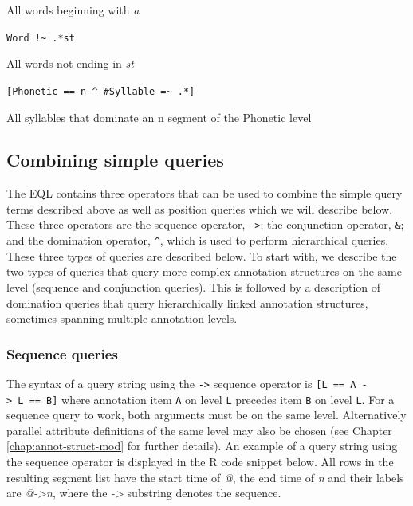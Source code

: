 \documentclass[]{book}
\begin{document}
All words beginning with \emph{a}

\texttt{Word\ !\textasciitilde{}\ .*st}

All words not ending in \emph{st}

\texttt{{[}Phonetic\ ==\ n\ \^{}\ \#Syllable\ =\textasciitilde{}\ .*{]}}

All syllables that dominate an n segment of the Phonetic level

\hypertarget{combining-simple-queries}{%
\subsection{Combining simple queries}\label{combining-simple-queries}}

The EQL contains three operators that can be used to combine the simple query terms described above as well as position queries which we will describe below. These three operators are the sequence operator, \texttt{-\textgreater{}}; the conjunction operator, \texttt{\&}; and the domination operator, \texttt{\^{}}, which is used to perform hierarchical queries. These three types of queries are described below. To start with, we describe the two types of queries that query more complex annotation structures on the same level (sequence and conjunction queries). This is followed by a description of domination queries that query hierarchically linked annotation structures, sometimes spanning multiple annotation levels.

\hypertarget{sequence-queries}{%
\subsubsection{Sequence queries}\label{sequence-queries}}

The syntax of a query string using the \texttt{-\textgreater{}} sequence operator is \texttt{{[}L\ ==\ A\ -\textgreater{}\ L\ ==\ B{]}} where annotation item \texttt{A} on level \texttt{L} precedes item \texttt{B} on level \texttt{L}. For a sequence query to work, both arguments must be on the same level. Alternatively parallel attribute definitions of the same level may also be chosen (see Chapter \ref{chap:annot-struct-mod} for further details). An example of a query string using the sequence operator is displayed in the R code snippet below. All rows in the resulting segment list have the start time of \emph{@}, the end time of \emph{n} and their labels are \emph{@-\textgreater{}n}, where the \emph{-\textgreater{}} substring denotes the sequence.
\end{document}
